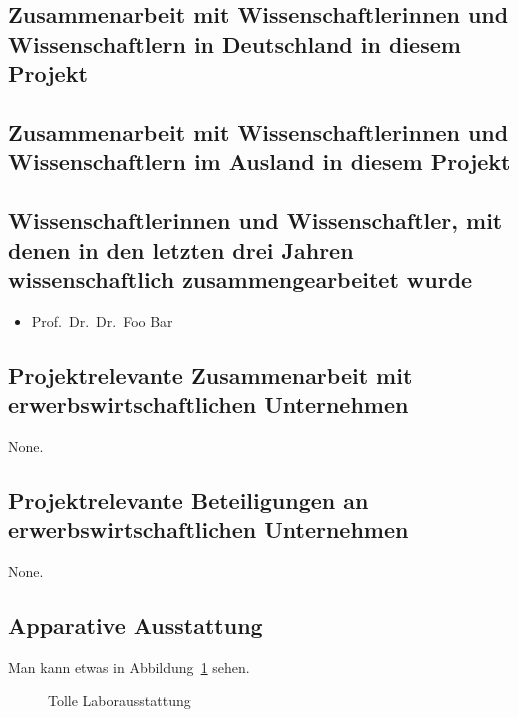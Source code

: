 \documentclass{scrartcl}
\begin{document}
\subsection{Zusammenarbeit mit Wissenschaftlerinnen und Wissenschaftlern in Deutschland in diesem Projekt}

\subsection{Zusammenarbeit mit Wissenschaftlerinnen und Wissenschaftlern im Ausland in diesem Projekt}

\subsection{Wissenschaftlerinnen und Wissenschaftler, mit denen in den letzten 
drei Jahren wissenschaftlich zusammengearbeitet wurde}
\begin{itemize}
  \item Prof.\ Dr.\ Dr.\ Foo Bar
\end{itemize}

\subsection{Projektrelevante Zusammenarbeit mit erwerbswirtschaftlichen Unternehmen}
None.

\subsection{Projektrelevante Beteiligungen an erwerbswirtschaftlichen Unternehmen}
None.

\subsection{Apparative Ausstattung}
Man kann etwas in Abbildung~\ref{fig:some_nice_graph} sehen.
\begin{figure}
\centering
{}
\caption{Tolle Laborausstattung}
\label{fig:some_nice_graph}
\end{figure}
\end{document}
